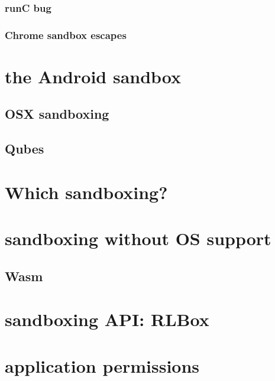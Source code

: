 \subsubsection{runC bug}



\subsubsection{Chrome sandbox escapes}


\section{the Android sandbox}



\subsection{OSX sandboxing}

\subsection{Qubes}


\section{Which sandboxing?}


\section{sandboxing without OS support}


\subsection{Wasm}



\section{sandboxing API: RLBox}


\section{application permissions}


